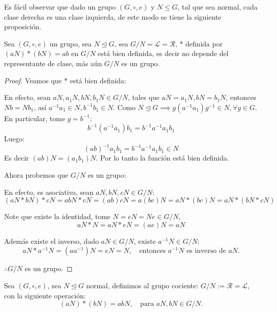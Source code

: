 Es fácil observar que dado un grupo $(G, \circ, e)$ y $N \le G$, tal que sea normal, cada clase derecha es una clase izquierda, de este modo se tiene la siguiente proposición.

\begin{prop}
	Sea $(G, \circ, e)$ un grupo, sea $N \trianglelefteq G$, sea $G/N = \mathcal{L} = \mathcal{R}$, $*$ definida por $(aN)*(bN) = ab$ en $G/N$ está bien definida, es decir no depende del representante de clase, más aún $G/N$ es un grupo.
\end{prop}

\begin{proof}
	Veamos que $*$ está bien definida:

	En efecto, sean $aN, a_1N, bN, b_1N \in G/N$, tales que $aN = a_1N, bN = b_1N$, entonces $Nb = Nb_1$, así $a^{-1}a_1 \in N, b^{-1}b_1 \in N$.
	Como $N \trianglelefteq G \implies g(a^{-1}a_1)g^{-1} \in N, \forall g \in G$.
	En particular, tome $g = b^{-1}$:
	\begin{equation*}
		b^{-1}(a^{-1}a_1)b_1 = b^{-1}a^{-1}a_1 b_1
	\end{equation*}
	Luego:
	\begin{equation*}
		(ab)^{-1}a_1 b_1 = b^{-1}a^{-1}a_1 b_1 \in N
	\end{equation*}
	Es decir $(ab)N = (a_1 b_1)N$. Por lo tanto la función está bien definida.

	Ahora probemos que $G/N$ es un grupo:

	En efecto, es asociativa, sean $aN, bN, cN \in G/N$:
	\begin{equation*}
		(aN * bN) * cN = abN * cN = (ab)cN = a(bc)N = aN * (bc)N = aN * (bN * cN)
	\end{equation*}

	Note que existe la identidad, tome $N = eN = Ne \in G/N$,
	\begin{equation*}
		aN * N = aN * eN = (ae)N = aN
	\end{equation*}

	Además existe el inverso, dado $aN \in G/N$, existe $a^{-1}N \in G/N$:
	\begin{equation*}
		aN * a^{-1}N = (aa^{-1})N = eN = N, \quad \text{entonces } a^{-1}N \text{ es inverso de } aN.
	\end{equation*}

	$\therefore G/N$ es un grupo.
\end{proof}

\begin{defi}
	Sea $(G, \circ, e)$, sea $N \trianglelefteq G$ normal, definimos al grupo cociente: $G/N := \mathcal{R} = \mathcal{L}$, con la siguiente operación:
	\begin{equation*}
		(aN)*(bN) = abN, \quad \text{para } aN, bN \in G/N.
	\end{equation*}
\end{defi}
